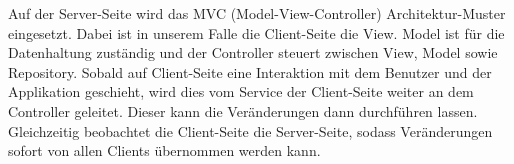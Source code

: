 Auf der Server-Seite wird das MVC (Model-View-Controller) Architektur-Muster eingesetzt. Dabei ist in unserem Falle die Client-Seite die View. Model ist für die Datenhaltung zuständig und der Controller steuert zwischen View, Model sowie Repository.  
Sobald auf Client-Seite eine Interaktion mit dem Benutzer und der Applikation geschieht, wird dies vom Service der Client-Seite weiter an dem Controller geleitet. Dieser kann die Veränderungen dann durchführen lassen.
Gleichzeitig beobachtet die Client-Seite die Server-Seite, sodass Veränderungen sofort von allen Clients übernommen werden kann.
